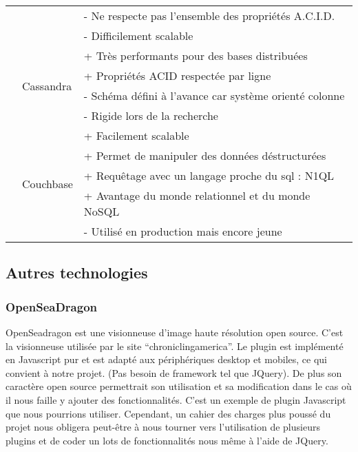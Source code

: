\begin{center}
\begin{tabular}{|l|l|l|}
            & & - Ne respecte pas l’ensemble des propriétés A.C.I.D. \\
            & & - Difficilement scalable \\ \cline{2-3}
            & \multirow{4}{*}{Cassandra} & + Très performants pour des bases distribuées \\
            & & + Propriétés ACID respectée par ligne \\
            & & - Schéma défini à l’avance car système orienté colonne \\
            & & - Rigide lors de la recherche \\ \cline{2-3}
            & \multirow{6}{*}{Couchbase} & + Facilement scalable \\
            & & + Permet de manipuler des données déstructurées \\
            & & + Requêtage avec un langage proche du sql : N1QL \\
            & & + Avantage du monde relationnel et du monde NoSQL \\
            & & - Utilisé en production mais encore jeune \\
            \hline
        \end{tabular}
        \end{center}


    \subsection{Autres technologies}
    \label{subsec:autrestechno}

        \subsubsection{OpenSeaDragon}
        \label{subsubsec:openseagdragon}
        OpenSeadragon est une visionneuse d’image haute résolution open source. C’est la visionneuse utilisée
        par le site “chroniclingamerica”. Le plugin est implémenté en Javascript pur et est adapté
        aux périphériques desktop et mobiles, ce qui convient à notre projet. (Pas besoin de framework tel que JQuery).
        De plus son caractère open source permettrait son utilisation et sa modification dans le cas où il
        nous faille y ajouter des fonctionnalités. C’est un exemple de plugin Javascript que nous pourrions utiliser.
        Cependant, un cahier des charges plus poussé du projet nous obligera peut-être à nous tourner vers
        l’utilisation de plusieurs plugins et de coder un lots de fonctionnalités nous même à l’aide de JQuery.

